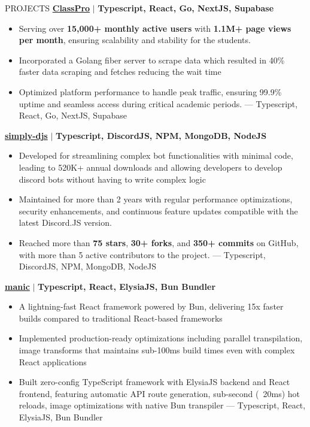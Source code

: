 \documentclass{resume} %
\begin{document}
\begin{rSection}{PROJECTS}    
    \textbf{\href{https://github.com/Rahuletto/ClassPro}{ClassPro}} \(\mid\) \textbf{Typescript, React, Go, NextJS, Supabase}
\begin{itemize}
\itemsep -3pt{}
\item Serving over \textbf{15,000+ monthly active users} with \textbf{1.1M+ page views per month}, ensuring scalability and stability for the students.
\item Incorporated a Golang fiber server to scrape data which resulted in 40\% faster data scraping and fetches reducing the wait time
\item Optimized platform performance to handle peak traffic, ensuring 99.9\% uptime and seamless access during critical academic periods.
---
Typescript, React, Go, NextJS, Supabase
\end{itemize}
\textbf{\href{https://github.com/Rahuletto/simply-djs}{simply-djs}} \(\mid\) \textbf{Typescript, DiscordJS, NPM, MongoDB, NodeJS}
\begin{itemize}
\itemsep -3pt{}
\item Developed for streamlining complex bot functionalities with minimal code, leading to 520K+ annual downloads and allowing developers to develop discord bots without having to write complex logic
\item Maintained for more than 2 years with regular performance optimizations, security enhancements, and continuous feature updates compatible with the latest Discord.JS version.
\item Reached more than \textbf{75 stars}, \textbf{30+ forks}, and \textbf{350+ commits} on GitHub, with more than 5 active contributors to the project.
---
Typescript, DiscordJS, NPM, MongoDB, NodeJS
\end{itemize}
\textbf{\href{https://github.com/Rahuletto/manic}{manic}} \(\mid\) \textbf{Typescript, React, ElysiaJS, Bun Bundler}
\begin{itemize}
\itemsep -3pt{}
\item A lightning-fast React framework powered by Bun, delivering 15x faster builds compared to traditional React-based frameworks
\item Implemented production-ready optimizations including parallel transpilation, image transforms that maintains sub-100ms build times even with complex React applications
\item Built zero-config TypeScript framework with ElysiaJS backend and React frontend, featuring automatic API route generation, sub-second (~20ms) hot reloads, image optimizations with native Bun transpiler
---
Typescript, React, ElysiaJS, Bun Bundler
\end{itemize}
\end{rSection}
\end{document}
